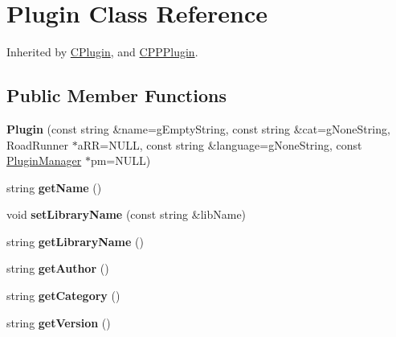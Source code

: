 \hypertarget{classrrp_1_1_plugin}{\section{Plugin Class Reference}
\label{classrrp_1_1_plugin}
}


Inherited by \hyperlink{classrrp_1_1_c_plugin}{C\-Plugin}, and \hyperlink{classrrp_1_1_c_p_p_plugin}{C\-P\-P\-Plugin}.

\subsection*{Public Member Functions}
\begin{DoxyCompactItemize}
\item 
\hypertarget{classrrp_1_1_plugin_aa8ecf9ddd0e6e0d9be96706bb2636fcb}{{\bfseries Plugin} (const string \&name=g\-Empty\-String, const string \&cat=g\-None\-String, Road\-Runner $\ast$a\-R\-R=N\-U\-L\-L, const string \&language=g\-None\-String, const \hyperlink{classrrp_1_1_plugin_manager}{Plugin\-Manager} $\ast$pm=N\-U\-L\-L)}\label{classrrp_1_1_plugin_aa8ecf9ddd0e6e0d9be96706bb2636fcb}

\item 
\hypertarget{classrrp_1_1_plugin_a11335e13e50af74108bf926dc1340b4b}{string {\bfseries get\-Name} ()}\label{classrrp_1_1_plugin_a11335e13e50af74108bf926dc1340b4b}

\item 
\hypertarget{classrrp_1_1_plugin_a6d9e58083e167f6061aea9f45f667cc4}{void {\bfseries set\-Library\-Name} (const string \&lib\-Name)}\label{classrrp_1_1_plugin_a6d9e58083e167f6061aea9f45f667cc4}

\item 
\hypertarget{classrrp_1_1_plugin_ae3eb2fe3aab2b6f71074a16a0afe2f42}{string {\bfseries get\-Library\-Name} ()}\label{classrrp_1_1_plugin_ae3eb2fe3aab2b6f71074a16a0afe2f42}

\item 
\hypertarget{classrrp_1_1_plugin_ae43e26f26f2e321551c286f9cb94f873}{string {\bfseries get\-Author} ()}\label{classrrp_1_1_plugin_ae43e26f26f2e321551c286f9cb94f873}

\item 
\hypertarget{classrrp_1_1_plugin_ac40ba451e9451ea01abfb3fce42bdbf8}{string {\bfseries get\-Category} ()}\label{classrrp_1_1_plugin_ac40ba451e9451ea01abfb3fce42bdbf8}

\item 
\hypertarget{classrrp_1_1_plugin_a9392c43f8a1b95e9f8ee260ef4d83297}{string {\bfseries get\-Version} ()}\label{classrrp_1_1_plugin_a9392c43f8a1b95e9f8ee260ef4d83297}


\end{DoxyCompactItemize}
